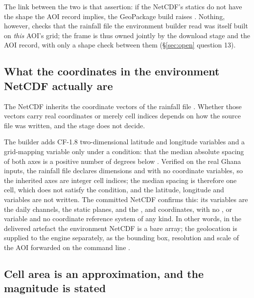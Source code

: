 \documentclass[11pt,a4paper]{article} \usepackage[utf8]{inputenc} \usepackage{lmodern} \usepackage[T1]{fontenc}
\begin{document}
The link between the two is that assertion: if the NetCDF's statics do not have the shape the
AOI record implies, the GeoPackage build raises
. Nothing, however, checks that the rainfall
file the environment builder read was itself built on \emph{this} AOI's grid; the frame is thus
owned jointly by the download stage and the AOI record, with only a shape check between them
(\S\ref{sec:open} question 13).

\subsection{What the coordinates in the environment NetCDF actually are}

The NetCDF inherits the coordinate vectors of the rainfall file
. Whether those vectors carry real
coordinates or merely cell indices depends on how the source file was written, and the stage
does not decide.

The builder adds CF-1.8 two-dimensional latitude and longitude variables and a grid-mapping
variable only under a condition: that the median absolute spacing of both axes is a positive
number of degrees below 
. Verified on the real Ghana inputs,
the rainfall file declares dimensions  and  with no coordinate variables, so the
inherited axes are integer cell indices; the median spacing is therefore one cell, which does
not satisfy the condition, and the latitude, longitude and  variables are not written.
The committed NetCDF  confirms this: its
variables are the  daily channels, the
 static planes, and the ,  and
 coordinates, with no ,  or  variable and no coordinate
reference system of any kind. In other words, in the delivered artefact the environment NetCDF
is a bare array; the geolocation is supplied to the engine separately, as the bounding box,
resolution and scale of the AOI forwarded on the command line
.

\subsection{Cell area is an approximation, and the magnitude is stated}
\end{document}
